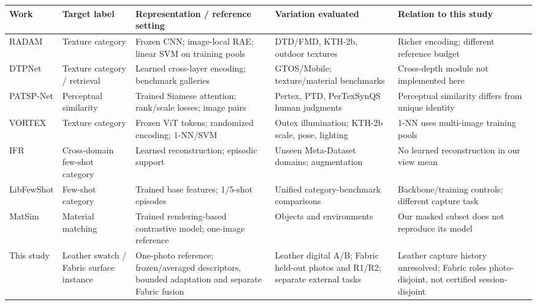 \begin{tabularx}{\linewidth}{@{}P{.13\linewidth}P{.16\linewidth}P{.24\linewidth}P{.20\linewidth}X@{}}
\toprule
Work & Target label & Representation / reference setting & Variation evaluated & Relation to this study \\
\midrule
RADAM \citep{scabini2023radam} & Texture category & Frozen CNN; image-local RAE; linear SVM on training pools & DTD/FMD, KTH-2b, outdoor textures & Richer encoding; different reference budget \\
DTPNet \citep{chen2024dtpnet} & Texture category / retrieval & Learned cross-layer encoding; benchmark galleries & GTOS/Mobile; texture/material benchmarks & Cross-depth module not implemented here \\
PATSP-Net \citep{wang2024patsp} & Perceptual similarity & Trained Siamese attention; rank/scale losses; image pairs & Pertex, PTD, PerTexSynQS human judgments & Perceptual similarity differs from unique identity \\
VORTEX \citep{scabini2025vortex} & Texture category & Frozen ViT tokens; randomized encoding; 1-NN/SVM & Outex illumination; KTH-2b scale, pose, lighting & 1-NN uses multi-image training pools \\
IFR \citep{tian2026ifr} & Cross-domain few-shot category & Learned reconstruction; episodic support & Unseen Meta-Dataset domains; augmentation & No learned reconstruction in our view mean \\
LibFewShot \citep{li2023libfewshot} & Few-shot category & Trained base features; 1/5-shot episodes & Unified category-benchmark comparisons & Backbone/training controls; different capture task \\
MatSim \citep{drehwald2023matsim} & Material matching & Trained rendering-based contrastive model; one-image reference & Objects and environments & Our masked subset does not reproduce its model \\
This study & Leather swatch / Fabric surface instance & One-photo reference; frozen/averaged descriptors, bounded adaptation and separate Fabric fusion & Leather digital A/B; Fabric held-out photos and R1/R2; separate external tasks & Leather capture history unresolved; Fabric roles photo-disjoint, not certified session-disjoint \\
\bottomrule
\end{tabularx}
